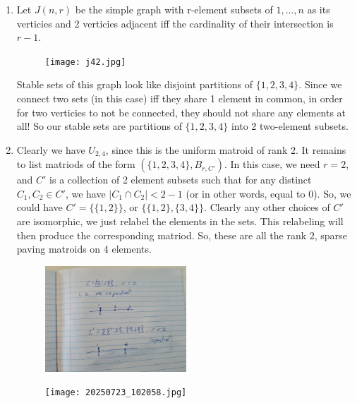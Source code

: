 \documentclass{article}
\begin{document}
\begin{enumerate}
    \item Let $J(n, r)$ be the simple graph with r-element subsets of $1, ..., n$ as its verticies and 2 verticies adjacent iff the cardinality of their intersection is $r-1$.
        \begin{figure}[!htb]
           \texttt{[image: j42.jpg]}
        \end{figure}
        Stable sets of this graph look like disjoint partitions of $\{1, 2, 3, 4\}$. Since we connect two sets (in this case)
         iff they share 1 element in common, in order for two verticies to not be connected, they should not share any elements at all!
         So our stable sets are partitions of $\{1, 2, 3, 4\}$ into 2 two-element subsets.
    \item Clearly we have $U_{2, 4}$, since this is the uniform matroid of rank 2. It remains to list matriods of the form $(\{1, 2, 3, 4\}, B_{r, C'})$.
        In this case, we need $r=2$, and $C'$ is a collection of 2 element subsets such that for any distinct $C_1, C_2\in C'$, we have $|C_1\cap C_2|< 2-1$
        (or in other words, equal to 0). So, we could have $C'=\{\{1, 2\}\}$, or $\{\{1, 2\}, \{3, 4\}\}$. Clearly any other choices of $C'$ are isomorphic, 
        we just relabel the elements in the sets. This relabeling will then produce the corresponding matriod. So, these are all the rank 2, sparse paving matroids 
        on 4 elements.
    \begin{figure}
        \includegraphics[width=0.5\textwidth]{20250723_102053.jpg}
    \end{figure}
    \begin{figure}
        \texttt{[image: 20250723\_102058.jpg]}
    \end{figure}
\end{enumerate}
\end{document}
